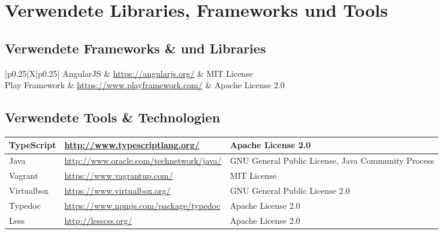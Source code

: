 \chapter{Verwendete Libraries, Frameworks und Tools}
	
	\section{Verwendete Frameworks \& und Libraries}		
	
		\begin{tabularx}{\linewidth}{|p{0.25\textwidth}|X|p{0.25\textwidth}|}
			\hline
			AngularJS & \url{https://angularjs.org/} & MIT License\\
			\hline
			Play Framework & \url{https://www.playframework.com/} & Apache License 2.0\\
			\hline
		\end{tabularx}
	
	\section{Verwendete Tools \& Technologien}
	
		\begin{tabularx}{\linewidth}{|p{}|X|p{}|}
			\hline
			TypeScript & \url{http://www.typescriptlang.org/} & Apache License 2.0\\
			\hline
			Java & \url{http://www.oracle.com/technetwork/java/} & GNU General Public License, Java Community Process\\
			\hline
			Vagrant & \url{https://www.vagrantup.com/} & MIT License\\
			\hline
			Virtualbox & \url{https://www.virtualbox.org/} &  GNU General Public License 2.0\\
			\hline
			Typedoc & \url{https://www.npmjs.com/package/typedoc} & Apache License 2.0\\
			\hline
			Less & \url{http://lesscss.org/} &  Apache License 2.0\\
			\hline
		\end{tabularx}
		
		
